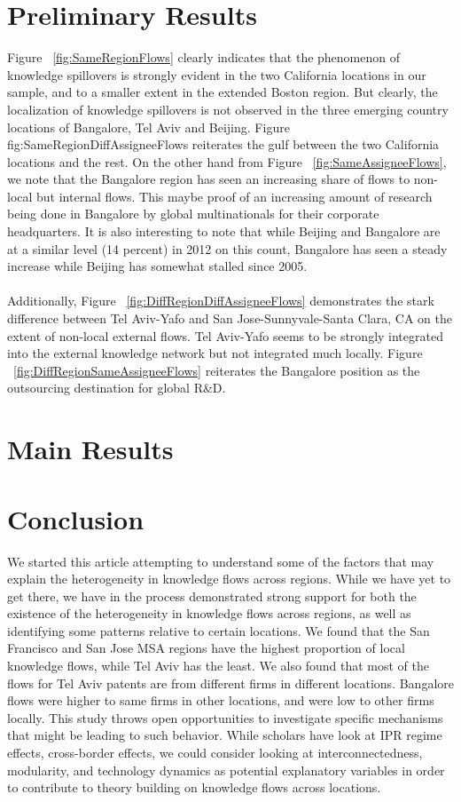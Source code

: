 \documentclass[12pt]{article}
\begin{document}
\newpage
\section{Preliminary Results}
Figure ~\ref{fig:SameRegionFlows} clearly indicates that the phenomenon of knowledge spillovers is strongly evident in the two California locations in our sample, and to a smaller extent in the extended Boston region. But clearly, the localization of knowledge spillovers is not observed in the three emerging country locations of Bangalore, Tel Aviv and Beijing. Figure {fig:SameRegionDiffAssigneeFlows} reiterates the gulf between the two California locations and the rest. On the other hand from Figure ~\ref{fig:SameAssigneeFlows}, we note that the Bangalore region has seen an increasing share of flows to non-local but internal flows. This maybe proof of an increasing amount of research being done in Bangalore by global multinationals for their corporate headquarters. It is also interesting to note that while Beijing and Bangalore are at a similar level (14 percent) in 2012 on this count, Bangalore has seen a steady increase while Beijing has somewhat stalled since 2005.
\\\\

Additionally, Figure ~\ref{fig:DiffRegionDiffAssigneeFlows} demonstrates the stark difference between Tel Aviv-Yafo and San Jose-Sunnyvale-Santa Clara, CA on the extent of non-local external flows. Tel Aviv-Yafo seems to be strongly integrated into the external knowledge network but not integrated much locally. Figure ~\ref{fig:DiffRegionSameAssigneeFlows} reiterates the Bangalore position as the outsourcing destination for global R\&D.

\newpage
\section{Main Results}

\section{Conclusion}
We started this article attempting to understand some of the factors that may explain the heterogeneity in knowledge flows across regions. While we have yet to get there, we have in the process demonstrated strong support for both the existence of the heterogeneity in knowledge flows across regions, as well as identifying some patterns relative to certain locations. We found that the San Francisco and San Jose MSA regions have the highest proportion of local knowledge flows, while Tel Aviv has the least. We also found that most of the flows for Tel Aviv patents are from different firms in different locations. Bangalore flows were higher to same firms in other locations, and were low to other firms locally. This study throws open opportunities to investigate specific mechanisms that might be leading to such behavior. While scholars have look at IPR regime effects, cross-border effects, we could consider looking at interconnectedness, modularity, and technology dynamics as potential explanatory variables in order to contribute to theory building on knowledge flows across locations.
\newpage
\end{document}
